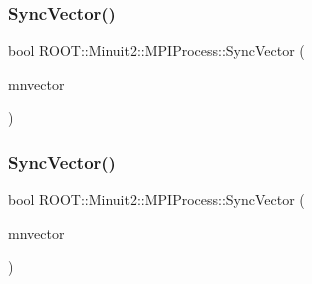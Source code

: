 \mbox{\label{classROOT_1_1Minuit2_1_1MPIProcess_a179f3ea817399a73cbce05d1778ec128}} 
\subsubsection{\texorpdfstring{SyncVector()}{SyncVector()}\hspace{0.1cm}{\footnotesize\ttfamily [2/3]}}
{\footnotesize\ttfamily bool R\+O\+O\+T\+::\+Minuit2\+::\+M\+P\+I\+Process\+::\+Sync\+Vector (\begin{DoxyParamCaption}\item[{\mbox{\hyperlink{namespaceROOT_1_1Minuit2_a62ed97730a1ca8d3fbaec64a19aa11c9}{R\+O\+O\+T\+::\+Minuit2\+::\+Mn\+Algebraic\+Vector}} \&}]{mnvector }\end{DoxyParamCaption})}

\mbox{\label{classROOT_1_1Minuit2_1_1MPIProcess_a179f3ea817399a73cbce05d1778ec128}} 
\subsubsection{\texorpdfstring{SyncVector()}{SyncVector()}\hspace{0.1cm}{\footnotesize\ttfamily [3/3]}}
{\footnotesize\ttfamily bool R\+O\+O\+T\+::\+Minuit2\+::\+M\+P\+I\+Process\+::\+Sync\+Vector (\begin{DoxyParamCaption}\item[{\mbox{\hyperlink{namespaceROOT_1_1Minuit2_a62ed97730a1ca8d3fbaec64a19aa11c9}{R\+O\+O\+T\+::\+Minuit2\+::\+Mn\+Algebraic\+Vector}} \&}]{mnvector }\end{DoxyParamCaption})}

